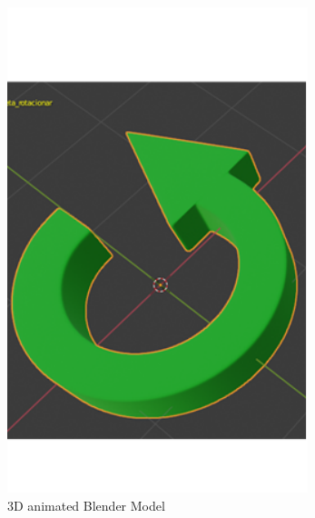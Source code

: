 \begin{figure}[!htbp]
\center
\begin{minipage}{0.495\linewidth}
\center
\captionsetup{justification=centering,margin=0cm,font=small}
\includegraphics[width=1\linewidth]{img/cap5/3dModel-Blender}
\caption{3D animated Blender Model} \label{fig:3dModel-Blender}
\end{minipage}
\begin{minipage}{0.495\linewidth}
\center
\captionsetup{justification=centering,margin=0cm,font=small}

\end{minipage}
\end{figure}
